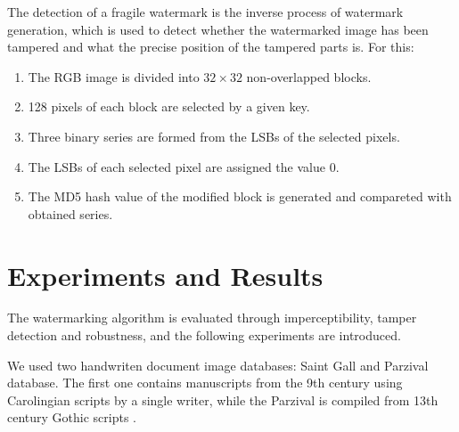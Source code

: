 \documentclass[runningheads]{llncs}
\begin{document}
The detection of a fragile watermark is the inverse process of watermark generation, which is used to detect whether the watermarked image has been tampered and what the precise position of the tampered parts is. For this:
\begin{enumerate}
	\item The RGB image is divided into $32\times 32$ non-overlapped blocks.
	\item 128 pixels of each block are selected by a given key.
	\item Three binary series are formed from the LSBs of the selected pixels.
	\item The LSBs of each selected pixel are assigned the value 0.
	\item The MD5 hash value of the modified block is generated and compareted with obtained series.
\end{enumerate}

\section{Experiments and Results}
The watermarking algorithm is evaluated through imperceptibility, tamper detection and robustness, and the following experiments are introduced.

We used two handwriten document image databases: Saint Gall \cite{fischer2011transcription} and Parzival \cite{fischer2009automatic} database. The first one contains manuscripts from the 9th century using Carolingian scripts by a single writer, while the Parzival is compiled from 13th century Gothic scripts \cite{pastor2016complete}.
 
\end{document}
